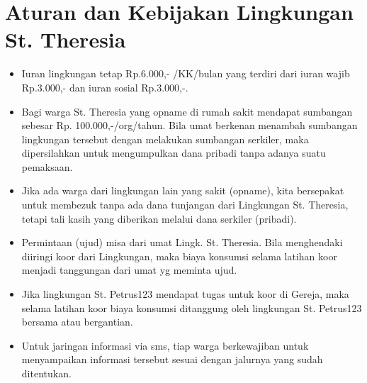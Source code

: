 \section{Aturan dan Kebijakan Lingkungan St. Theresia \tahun} 

\begin{itemize}
\item Iuran lingkungan tetap Rp.6.000,- /KK/bulan yang
terdiri dari iuran wajib Rp.3.000,- dan iuran sosial Rp.3.000,-.
\item Bagi warga St. Theresia yang opname di rumah sakit mendapat sumbangan sebesar
Rp. 100.000,-/org/tahun. Bila umat berkenan menambah sumbangan
lingkungan tersebut dengan melakukan sumbangan serkiler, maka
dipersilahkan untuk mengumpulkan dana pribadi tanpa adanya suatu
pemaksaan. 
\item Jika ada warga dari lingkungan lain yang sakit (opname), kita
bersepakat untuk membezuk tanpa ada dana tunjangan dari Lingkungan St.
Theresia, tetapi tali kasih yang diberikan melalui dana serkiler
(pribadi).
\item Permintaan (ujud) misa dari umat Lingk. St. Theresia. Bila
menghendaki diiringi koor dari Lingkungan, maka biaya konsumsi selama
latihan koor menjadi tanggungan dari umat yg meminta ujud.
\item Jika lingkungan St. Petrus123 mendapat tugas untuk koor di Gereja,
maka selama latihan koor biaya konsumsi ditanggung oleh lingkungan St.
Petrus123 bersama atau bergantian. 
\item Untuk jaringan informasi via sms, tiap warga berkewajiban untuk
menyampaikan informasi tersebut sesuai dengan jalurnya yang sudah
ditentukan.
\end{itemize}

